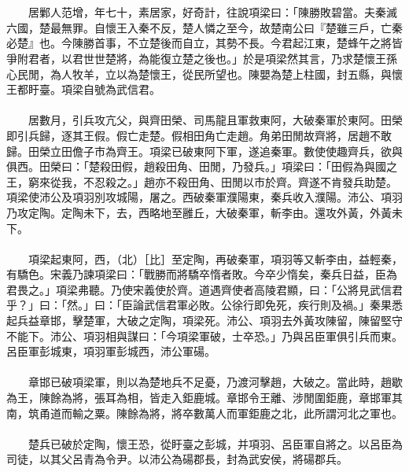\\\\
　　居鄛人范增，年七十，素居家，好奇計，往說項梁曰：「陳勝敗碧當。夫秦滅六國，楚最無罪。自懷王入秦不反，楚人憐之至今，故楚南公曰『楚雖三戶，亡秦必楚』也。今陳勝首事，不立楚後而自立，其勢不長。今君起江東，楚蜂午之將皆爭附君者，以君世世楚將，為能復立楚之後也。」於是項梁然其言，乃求楚懷王孫心民閒，為人牧羊，立以為楚懷王，從民所望也。陳嬰為楚上柱國，封五縣，與懷王都盱臺。項梁自號為武信君。
\\\\
　　居數月，引兵攻亢父，與齊田榮、司馬龍且軍救東阿，大破秦軍於東阿。田榮即引兵歸，逐其王假。假亡走楚。假相田角亡走趙。角弟田閒故齊將，居趙不敢歸。田榮立田儋子市為齊王。項梁已破東阿下軍，遂追秦軍。數使使趣齊兵，欲與俱西。田榮曰：「楚殺田假，趙殺田角、田閒，乃發兵。」項梁曰：「田假為與國之王，窮來從我，不忍殺之。」趙亦不殺田角、田閒以市於齊。齊遂不肯發兵助楚。項梁使沛公及項羽別攻城陽，屠之。西破秦軍濮陽東，秦兵收入濮陽。沛公、項羽乃攻定陶。定陶未下，去，西略地至雝丘，大破秦軍，斬李由。還攻外黃，外黃未下。
\\\\
　　項梁起東阿，西，（北）［比］至定陶，再破秦軍，項羽等又斬李由，益輕秦，有驕色。宋義乃諫項梁曰：「戰勝而將驕卒惰者敗。今卒少惰矣，秦兵日益，臣為君畏之。」項梁弗聽。乃使宋義使於齊。道遇齊使者高陵君顯，曰：「公將見武信君乎？」曰：「然。」曰：「臣論武信君軍必敗。公徐行即免死，疾行則及禍。」秦果悉起兵益章邯，擊楚軍，大破之定陶，項梁死。沛公、項羽去外黃攻陳留，陳留堅守不能下。沛公、項羽相與謀曰：「今項梁軍破，士卒恐。」乃與呂臣軍俱引兵而東。呂臣軍彭城東，項羽軍彭城西，沛公軍碭。
\\\\
　　章邯已破項梁軍，則以為楚地兵不足憂，乃渡河擊趙，大破之。當此時，趙歇為王，陳餘為將，張耳為相，皆走入鉅鹿城。章邯令王離、涉閒圍鉅鹿，章邯軍其南，筑甬道而輸之粟。陳餘為將，將卒數萬人而軍鉅鹿之北，此所謂河北之軍也。
\\\\
　　楚兵已破於定陶，懷王恐，從盱臺之彭城，并項羽、呂臣軍自將之。以呂臣為司徒，以其父呂青為令尹。以沛公為碭郡長，封為武安侯，將碭郡兵。
\\\\
